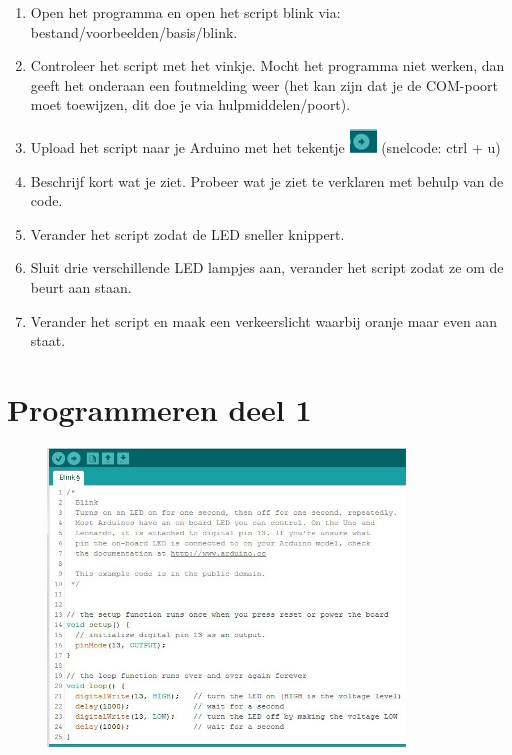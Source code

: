 \documentclass{arduino}
\begin{document}
\begin{enumerate}[label={\alph*})]
\item Open het programma en open het script blink via: bestand/voorbeelden/basis/blink.

\item Controleer het script met het vinkje. Mocht het programma niet werken, dan geeft het onderaan een foutmelding weer (het kan zijn dat je de COM-poort moet toewijzen, dit doe je via hulpmiddelen/poort).

\item Upload het script naar je Arduino met het tekentje \includegraphics{10. Arduino upload} (snelcode: ctrl + u)

\item Beschrijf kort wat je ziet. Probeer wat je ziet te verklaren met behulp van de code.

\item Verander het script zodat de LED sneller knippert.

\item Sluit drie verschillende LED lampjes aan, verander het script zodat ze om de beurt aan staan.

\item Verander het script en maak een verkeerslicht waarbij oranje maar even aan staat.
\end{enumerate}

\section{Programmeren deel 1}

\begin{figure}
\raggedleft
\includegraphics[width=9.5cm]{12. Arduino code}
\end{figure}
\end{document}
